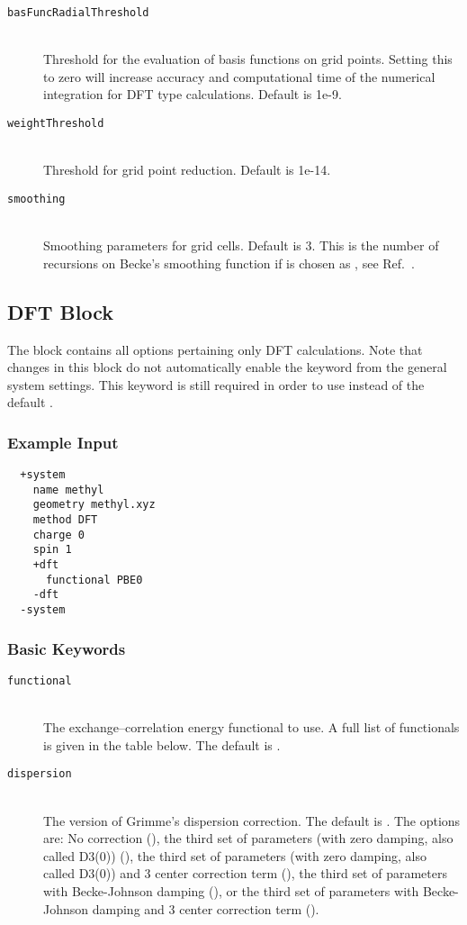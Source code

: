 \begin{description}
    \item [\texttt{basFuncRadialThreshold}]\hfill \\
    Threshold for the evaluation of basis functions on grid points. Setting this to zero will increase accuracy and computational time of the numerical 
    integration for DFT type calculations. Default is 1e-9.
    \item [\texttt{weightThreshold}]\hfill \\
    Threshold for grid point reduction. Default is 1e-14.
    \item [\texttt{smoothing}]\hfill \\
    Smoothing parameters for grid cells. Default is 3. This is the number of recursions on Becke's smoothing 
    function if  is chosen as , see Ref.~\cite{beck1988}.
 \end{description}


\subsection{DFT Block}\label{sec:system:dft}
The  block contains all options pertaining only DFT calculations.
Note that changes in this block do not automatically enable the 
keyword from the general system settings.
This keyword is still required in order to use  instead of the default .
\subsubsection{Example Input}
\begin{lstlisting}
  +system
    name methyl 
    geometry methyl.xyz
    method DFT 
    charge 0
    spin 1
    +dft
      functional PBE0
    -dft
  -system
 \end{lstlisting}
\subsubsection{Basic Keywords}
\begin{description}
  \item [\texttt{functional}]\hfill \\
  The exchange--correlation energy functional to use. A full list of functionals is given in the table below.
  The default is .
 \item [\texttt{dispersion}]\hfill \\
 The version of Grimme's dispersion correction. The default is . The options are:
 No correction (), the third set of parameters (with zero damping, also called D3(0)) (),
 the third set of parameters (with zero damping, also called D3(0)) and 3 center correction term (),
 the third set of parameters with Becke-Johnson damping (),
 or the third set of parameters with Becke-Johnson damping and 3 center correction term ().
\end{description}

